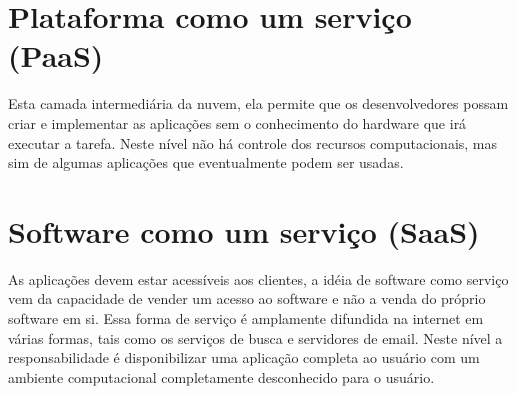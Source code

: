 \documentclass[
	12pt,				%
	openright,			%
	twoside,			%
	a4paper,			%
	Times,
	brazil,				%
	]{abntex2}
\begin{document}
\section{Plataforma como um serviço (PaaS)}
Esta camada intermediária da nuvem, ela permite que os desenvolvedores possam criar e implementar as aplicações sem o conhecimento do hardware que irá executar a tarefa. Neste nível não há controle dos recursos computacionais, mas sim de algumas aplicações que eventualmente podem ser usadas\cite{saas, nuvem, nuvem2}.
\par

\section{Software como um serviço (SaaS)}
As aplicações devem estar acessíveis aos clientes, a idéia de software como serviço vem da capacidade de vender um acesso ao software e não a venda do próprio software em si. Essa forma de serviço é amplamente difundida na internet em várias formas, tais como os serviços de busca e servidores de email. Neste nível a responsabilidade é disponibilizar uma aplicação completa ao usuário com um ambiente computacional completamente desconhecido para o usuário\cite{saas, nuvem, nuvem2}.
\par





\end{document}
